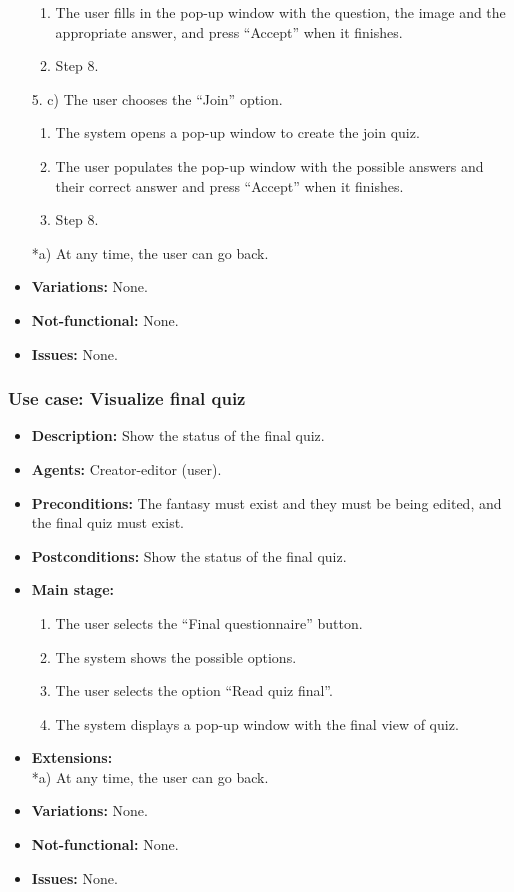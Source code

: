 \begin{itemize}
\begin{enumerate}
		\item The user fills in the pop-up window with the question, the image and the appropriate answer, and press ``Accept'' when it finishes.
		\item Step 8.
	\end{enumerate}
	5. c) The user chooses the ``Join'' option.
	\begin{enumerate}
		\item The system opens a pop-up window to create the join quiz.
		\item The user populates the pop-up window with the possible answers and their correct answer and press ``Accept'' when it finishes.
		\item Step 8.
	\end{enumerate}
	*a) At any time, the user can go back.
	\item \textbf{Variations:} None.
	\item \textbf{Not-functional:} None.
	\item \textbf{Issues:} None.
\end{itemize}

\subsubsection{Use case: Visualize final quiz}
\begin{itemize}
	\item \textbf{Description:} Show the status of the final quiz.
	\item \textbf{Agents:} Creator-editor (user).
	\item \textbf{Preconditions:} The fantasy must exist and they must be being edited, and the final quiz must exist.
	\item \textbf{Postconditions:} Show the status of the final quiz.
	\item \textbf{Main stage:}
	\begin{enumerate}
		\item The user selects the ``Final questionnaire'' button.
		\item The system shows the possible options.
		\item The user selects the option ``Read quiz final''.
		\item The system displays a pop-up window with the final view of quiz.
	\end{enumerate}
	\item \textbf{Extensions:} \\ *a) At any time, the user can go back.
	\item \textbf{Variations:} None.
	\item \textbf{Not-functional:} None.
	\item \textbf{Issues:} None.
\end{itemize}

